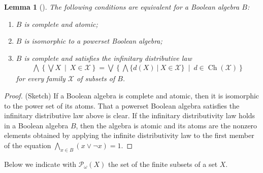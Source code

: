 \documentclass{article}
\newtheorem{lem}{Lemma}
\theoremstyle{definition}
\DeclareMathOperator{\Ch}{Ch}
\begin{document}
\begin{lem}[{\cite[Chapter VII, Proposition 1.16]{Stone}}]
The following conditions are equivalent for a Boolean algebra $B$:
\begin{enumerate}\label{lem:caba}
    \item[\rm (i)] $B$ is complete and atomic;
    \item[\rm (ii)] $B$ is isomorphic to a powerset Boolean algebra;
    \item[\rm (iii)] $B$ is complete and satisfies the infinitary distributive law
    \begin{align}\label{eq:id}
    \bigwedge \left\{\bigvee X\ \middle\vert\ X \in \mathscr{X}\right\} = \bigvee \left\{\bigwedge \{d(X)\ \vert\ X \in \mathscr{X}\}\ \middle\vert\ d \in \Ch(\mathscr{X})\right\}\tag{ID}
    \end{align}
    for every family $\mathscr{X}$ of subsets of $B$.
\end{enumerate}
\end{lem}

\begin{proof} (Sketch) If a Boolean algebra is complete and atomic, then it is isomorphic to the power set of its atoms. That a powerset Boolean algebra satisfies the infinitary distributive law above is clear. If the infinitary distributivity law holds in a Boolean algebra $B$, then the algebra is atomic and its atoms are the nonzero elements obtained by applying the infinite distributivity law to the first member of the equation $\bigwedge_{x\in B} (x\vee \neg x)=1$.
\end{proof}

Below we indicate with $\mathcal{P}_\omega(X)$ the set of the finite subsets of a set $X$.
\end{document}
